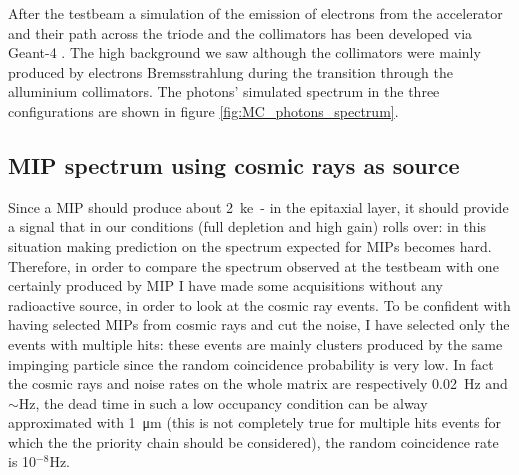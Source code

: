    After the testbeam a simulation of the emission of electrons from the accelerator and their path across the triode and the collimators has been developed via Geant-4 . 
   The high background we saw although the collimators were mainly produced by electrons Bremsstrahlung during the transition through the alluminium collimators. 
   The photons' simulated spectrum in the three configurations are shown in figure \ref{fig:MC_photons_spectrum}. 

   \subsection{MIP spectrum using cosmic rays as source}
      Since a MIP should produce about \SI{2}{ke-} in the epitaxial layer, it should provide a signal that in our conditions (full depletion and high gain) rolls over: in this situation making prediction on the spectrum expected for MIPs becomes hard. 
      Therefore, in order to compare the spectrum observed at the testbeam with one certainly produced by MIP I have made some acquisitions without any radioactive source, in order to look at the cosmic ray events. 
      To be confident with having selected MIPs from cosmic rays and cut the noise, I have selected only the events with multiple hits: these events are mainly clusters produced by the same impinging particle since the random coincidence probability is very low. 
      In fact the cosmic rays and noise rates on the whole matrix are respectively \SI{0.02}{Hz} and $\sim$\si{Hz}, the dead time in such a low occupancy condition can be alway approximated with \SI{1}{\um} (this is not completely true for multiple hits events for which the the priority chain should be considered), the random coincidence rate is 10$^{-8}$\si{Hz}.
   

